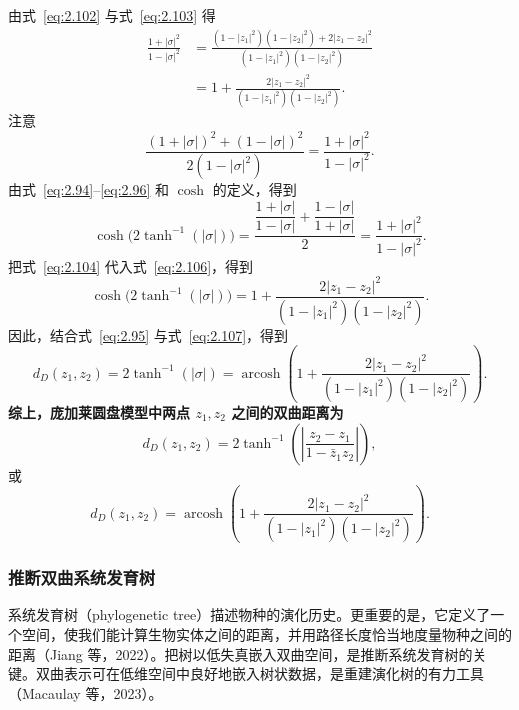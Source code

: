 由式~\eqref{eq:2.102} 与式~\eqref{eq:2.103} 得
\begin{equation*}
  \begin{aligned}
    \frac{1+|\sigma|^2}{1-|\sigma|^2}
      &=\frac{(1-|z_1|^2)(1-|z_2|^2)+2|z_1-z_2|^2}{(1-|z_1|^2)(1-|z_2|^2)}\\
      &=1+\frac{2|z_1-z_2|^2}{(1-|z_1|^2)(1-|z_2|^2)}.
  \end{aligned}
  \tag{2.104}\label{eq:2.104}
\end{equation*}
注意
\begin{equation*}
  \frac{(1+|\sigma|)^2+(1-|\sigma|)^2}{2(1-|\sigma|^2)}
      =\frac{1+|\sigma|^2}{1-|\sigma|^2}.
  \tag{2.105}\label{eq:2.105}
\end{equation*}
由式~\eqref{eq:2.94}–\eqref{eq:2.96} 和 $\cosh$ 的定义，得到
\begin{equation*}
  \cosh\bigl(2\tanh^{-1}(|\sigma|)\bigr)
    =\frac{\dfrac{1+|\sigma|}{1-|\sigma|}+\dfrac{1-|\sigma|}{1+|\sigma|}}{2}
    =\frac{1+|\sigma|^2}{1-|\sigma|^2}.
  \tag{2.106}\label{eq:2.106}
\end{equation*}
把式~\eqref{eq:2.104} 代入式~\eqref{eq:2.106}，得到
\begin{equation*}
  \cosh\bigl(2\tanh^{-1}(|\sigma|)\bigr)
    =1+\frac{2|z_1-z_2|^2}{(1-|z_1|^2)(1-|z_2|^2)}.
  \tag{2.107}\label{eq:2.107}
\end{equation*}
因此，结合式~\eqref{eq:2.95} 与式~\eqref{eq:2.107}，得到
\[
  d_D(z_1,z_2)=2\tanh^{-1}(|\sigma|)
    =\operatorname{arcosh}\!\left(1+\frac{2|z_1-z_2|^2}{(1-|z_1|^2)(1-|z_2|^2)}\right).
\]
\textbf{综上，庞加莱圆盘模型中两点 $z_1,z_2$ 之间的双曲距离为}
\begin{equation*}
  d_D(z_1,z_2)=2\tanh^{-1}\!\left(\left|\frac{z_2-z_1}{1-\bar z_1z_2}\right|\right),
  \tag{2.108}\label{eq:2.108}
\end{equation*}
或
\begin{equation*}
  d_D(z_1,z_2)=\operatorname{arcosh}\!\left(
    1+\frac{2|z_1-z_2|^2}{(1-|z_1|^2)(1-|z_2|^2)}\right).
  \tag{2.109}\label{eq:2.109}
\end{equation*}

\subsubsection{推断双曲系统发育树}
系统发育树（phylogenetic tree）描述物种的演化历史。更重要的是，它定义了一个空间，使我们能计算生物实体之间的距离，并用路径长度恰当地度量物种之间的距离（Jiang 等，2022）。把树以低失真嵌入双曲空间，是推断系统发育树的关键。双曲表示可在低维空间中良好地嵌入树状数据，是重建演化树的有力工具（Macaulay 等，2023）。

